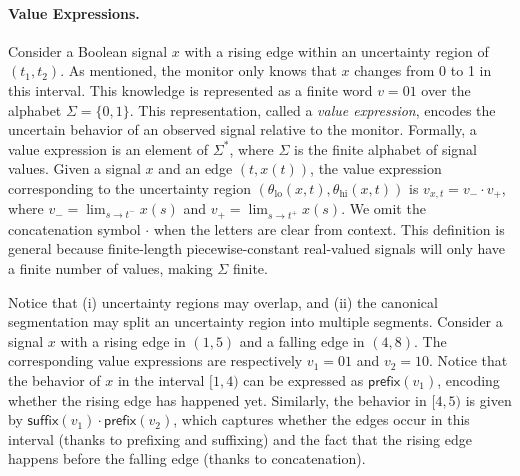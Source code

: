 \documentclass[iicol,lineno]{sn-jnl}
\renewcommand{\pfx}{\textsf{prefix}}
\renewcommand{\sfx}{\textsf{suffix}}
\newcommand{\?}{\text{?}}
\begin{document}
	
	\paragraph*{Value Expressions.}
	Consider a Boolean signal \( x \) with a rising edge within an uncertainty region of \((t_1, t_2)\).
	As mentioned, the monitor only knows that \( x \) changes from 0 to 1 in this interval.
	This knowledge is represented as a finite word \( v = 01 \) over the alphabet \(\Sigma = \{0,1\}\).
	This representation, called a \emph{value expression}, encodes the uncertain behavior of an observed signal relative to the monitor.
	Formally, a value expression is an element of \(\Sigma^*\), where \(\Sigma\) is the finite alphabet of signal values.
	Given a signal \( x \) and an edge \((t, x(t))\), the value expression corresponding to the uncertainty region \((\theta_{\text{lo}}(x,t), \theta_{\text{hi}}(x,t))\) is \( v_{x,t} = v_- \cdot v_+ \), where \( v_- = \lim_{s \to t^-} x(s) \) and \( v_+ = \lim_{s \to t^+} x(s) \).
	We omit the concatenation symbol \(\cdot\) when the letters are clear from context.
	This definition is general because finite-length piecewise-constant real-valued signals will only have a finite number of values, making \(\Sigma\) finite.
	
	Notice that (i) uncertainty regions may overlap, and (ii) the canonical segmentation may split an uncertainty region into multiple segments.
	Consider a signal $x$ with a rising edge in $(1,5)$ and a falling edge in $(4,8)$.
	The corresponding value expressions are respectively $v_1 = 01$ and $v_2 = 10$.
	Notice that the behavior of $x$ in the interval $[1,4)$ can be expressed as $\pfx(v_1)$, encoding whether the rising edge has happened yet.
	Similarly, the behavior in $[4,5)$ is given by $\sfx(v_1) \cdot \pfx(v_2)$, which captures whether the edges occur in this interval (thanks to prefixing and suffixing) and the fact that the rising edge happens before the falling edge (thanks to concatenation).
	
	
\end{document}
